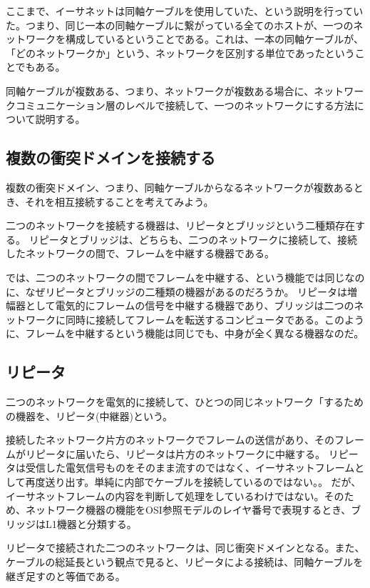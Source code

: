ここまで、イーサネットは同軸ケーブルを使用していた、という説明を行っていた。つまり、同じ一本の同軸ケーブルに繋がっている全てのホストが、一つのネットワークを構成しているということである。これは、一本の同軸ケーブルが、「どのネットワークか」という、ネットワークを区別する単位であったということでもある。

同軸ケーブルが複数ある、つまり、ネットワークが複数ある場合に、ネットワークコミュニケーション層のレベルで接続して、一つのネットワークにする方法について説明する。

\subsection{複数の衝突ドメインを接続する}

複数の衝突ドメイン、つまり、同軸ケーブルからなるネットワークが複数あるとき、それを相互接続することを考えてみよう。

二つのネットワークを接続する機器は、リピータとブリッジという二種類存在する。
リピータとブリッジは、どちらも、二つのネットワークに接続して、接続したネットワークの間で、フレームを中継する機器である。

では、二つのネットワークの間でフレームを中継する、という機能では同じなのに、なぜリピータとブリッジの二種類の機器があるのだろうか。
リピータは増幅器として電気的にフレームの信号を中継する機器であり、ブリッジは二つのネットワークに同時に接続してフレームを転送するコンピュータである。このように、フレームを中継するという機能は同じでも、中身が全く異なる機器なのだ。

\subsection{リピータ}

二つのネットワークを電気的に接続して、ひとつの同じネットワーク「するための機器を、リピータ(中継器)という。

接続したネットワーク片方のネットワークでフレームの送信があり、そのフレームがリピータに届いたら、リピータは片方のネットワークに中継する。
リピータは受信した電気信号ものをそのまま流すのではなく、イーサネットフレームとして再度送り出す。単純に内部でケーブルを接続しているのではない。。
だが、イーサネットフレームの内容を判断して処理をしているわけではない。そのため、ネットワーク機器の機能をOSI参照モデルのレイヤ番号で表現するとき、ブリッジはL1機器と分類する。

リピータで接続された二つのネットワークは、同じ衝突ドメインとなる。また、ケーブルの総延長という観点で見ると、リピータによる接続は、同軸ケーブルを継ぎ足すのと等価である。

